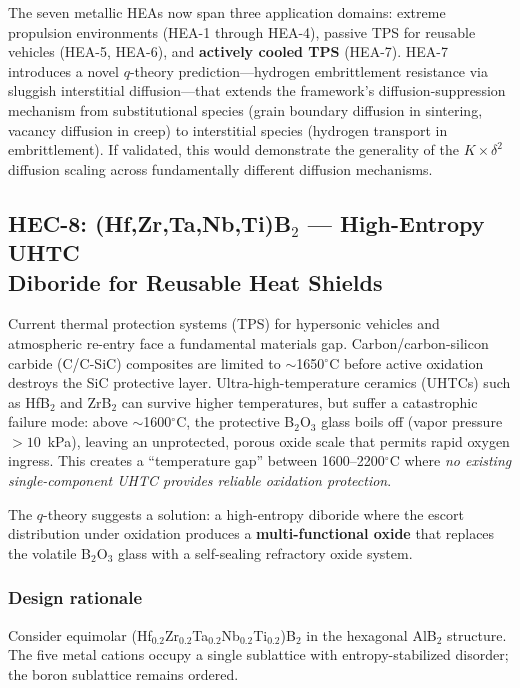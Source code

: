 \documentclass[12pt,letterpaper]{article}
\theoremstyle{definition}
\begin{document}
The seven metallic HEAs now span three application domains: extreme propulsion environments (HEA-1 through HEA-4), passive TPS for reusable vehicles (HEA-5, HEA-6), and \textbf{actively cooled TPS} (HEA-7).  HEA-7 introduces a novel $q$-theory prediction---hydrogen embrittlement resistance via sluggish interstitial diffusion---that extends the framework's diffusion-suppression mechanism from substitutional species (grain boundary diffusion in sintering, vacancy diffusion in creep) to interstitial species (hydrogen transport in embrittlement).  If validated, this would demonstrate the generality of the $K \times \delta^2$ diffusion scaling across fundamentally different diffusion mechanisms.


\subsection[HEC-8: High-Entropy UHTC Diboride for Heat Shields]{HEC-8: (Hf,Zr,Ta,Nb,Ti)B$_2$ --- High-Entropy UHTC\\Diboride for Reusable Heat Shields}\label{sec:hec8}

Current thermal protection systems (TPS) for hypersonic vehicles and atmospheric re-entry face a fundamental materials gap.  Carbon/carbon-silicon carbide (C/C-SiC) composites are limited to $\sim$1650$^\circ$C before active oxidation destroys the SiC protective layer.  Ultra-high-temperature ceramics (UHTCs) such as HfB$_2$ and ZrB$_2$ can survive higher temperatures, but suffer a catastrophic failure mode: above $\sim$1600$^\circ$C, the protective B$_2$O$_3$ glass boils off (vapor pressure $> 10$~kPa), leaving an unprotected, porous oxide scale that permits rapid oxygen ingress.  This creates a ``temperature gap'' between 1600--2200$^\circ$C where \emph{no existing single-component UHTC provides reliable oxidation protection}.

The $q$-theory suggests a solution: a high-entropy diboride where the escort distribution under oxidation produces a \textbf{multi-functional oxide} that replaces the volatile B$_2$O$_3$ glass with a self-sealing refractory oxide system.

\subsubsection{Design rationale}

Consider equimolar (Hf$_{0.2}$Zr$_{0.2}$Ta$_{0.2}$Nb$_{0.2}$Ti$_{0.2}$)B$_2$ in the hexagonal AlB$_2$ structure.  The five metal cations occupy a single sublattice with entropy-stabilized disorder; the boron sublattice remains ordered.
\end{document}
